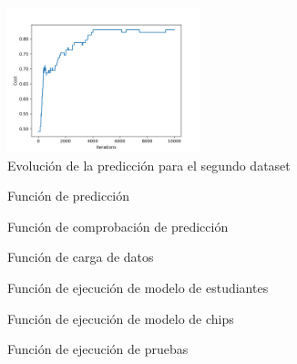 \documentclass[6pt]{../../shared/AiTex}
\begin{document}
\begin{figure}[H]
    \centering
    \includegraphics[width=0.5\textwidth]{./imagenes/muestreo2_accuracy.png}
    \caption{Evolución de la predicción para el segundo dataset}
    \label{fig:prediction_evolution2}
\end{figure}

\begin{figure}[H]
    \centering
    
    \caption{Función de predicción}
    \label{fig:predict}
\end{figure}

\begin{figure}[H]
    \centering
    
    \caption{Función de comprobación de predicción}
    \label{fig:predict_check}
\end{figure}

\begin{figure}[H]
    \centering
    
    \caption{Función de carga de datos}
    \label{fig:load_data}
\end{figure}

\begin{figure}[H]
    \centering
    
    \caption{Función de ejecución de modelo de estudiantes}
    \label{fig:run_student_sim}
\end{figure}

\begin{figure}[H]
    \centering
    
    \caption{Función de ejecución de modelo de chips}
    \label{fig:run_chip_sim}
\end{figure}

\begin{figure}[H]
    \centering
    
    \caption{Función de ejecución de pruebas}
    \label{fig:run_tests}
\end{figure}
\end{document}
